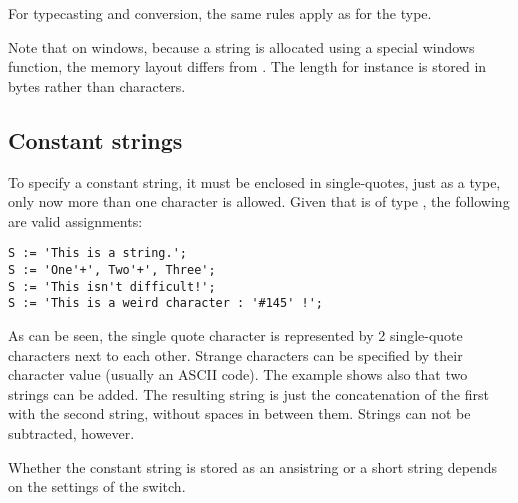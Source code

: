 For typecasting and conversion, the same rules apply as for the  type.

Note that on windows, because a  string is allocated using a special windows function, the
memory layout differs from . The length for instance is stored in bytes rather than characters.

\subsection{Constant strings}
To specify a constant string, it must be enclosed in single-quotes, just
as a  type, only now more than one character is allowed.
Given that  is of type , the following are valid assignments:
\begin{verbatim}
S := 'This is a string.';
S := 'One'+', Two'+', Three';
S := 'This isn't difficult!';
S := 'This is a weird character : '#145' !';
\end{verbatim}
As can be seen, the single quote character is represented by 2 single-quote
characters next to each other. Strange characters can be specified by their
character value (usually an ASCII code).
The example shows also that two strings can be added. The resulting string is
just the concatenation of the first with the second string, without spaces in
between them. Strings can not be subtracted, however.

Whether the constant string is stored as an ansistring or a short string
depends on the settings of the  switch.


